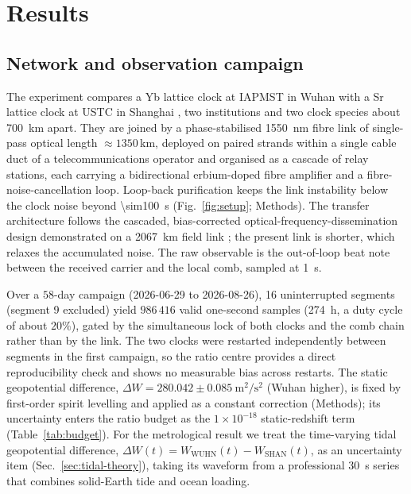 \documentclass[11pt,a4paper]{article}
\newcommand{\dW}{\Delta W}
\newcommand{\e}[1]{\times 10^{#1}}
\begin{document}
\section{Results}

\subsection{Network and observation campaign}
\label{sec:network}

The experiment compares a Yb lattice clock at IAPMST in Wuhan
\citep{zhu2026yb} with a Sr lattice clock at USTC in Shanghai
\citep{jia2026sr}, two institutions and two clock
species about \qty{700}{km} apart. They are joined by a phase-stabilised
\qty{1550}{nm} fibre link of single-pass optical length $\approx1350$\,km,
deployed on paired strands within a single cable duct of a
telecommunications operator and organised as a cascade of relay stations,
each carrying a bidirectional erbium-doped fibre amplifier and a
fibre-noise-cancellation loop. Loop-back purification keeps the link
instability below the clock noise beyond \qty{\sim100}{s}
(Fig.~\ref{fig:setup}; Methods). The transfer architecture follows the
cascaded, bias-corrected optical-frequency-dissemination design
demonstrated on a \qty{2067}{km} field link \citep{chen2026dissemination}; the
present link is shorter, which relaxes the accumulated noise. The raw
observable is the out-of-loop beat note between the received carrier and
the local comb, sampled at \qty{1}{s}.

{\sloppy
Over a $58$-day campaign (2026-06-29 to 2026-08-26), 16 uninterrupted
segments (segment 9 excluded) yield $986\,416$ valid one-second samples
(\qty{274}{h}, a duty cycle of about $20\%$), gated by the simultaneous lock of both clocks
and the comb chain rather than by the link. The two clocks were
restarted independently between segments in the first campaign, so the
ratio centre provides a direct reproducibility check and shows no
measurable bias across restarts. The static geopotential difference,
$\dW = 280.042\pm0.085\ \mathrm{m^{2}/s^{2}}$ (Wuhan higher), is fixed
by first-order spirit levelling and applied as a constant correction
(Methods); its uncertainty enters the ratio budget as the $1\e{-18}$
static-redshift term (Table~\ref{tab:budget}). For the metrological
result we treat the time-varying tidal geopotential difference,
$\dW(t) = W_{\mathrm{WUHN}}(t) - W_{\mathrm{SHAN}}(t)$, as an
uncertainty item (Sec.~\ref{sec:tidal-theory}), taking its waveform
from a professional \qty{30}{s} series that combines solid-Earth tide and
ocean loading.
\par}
\end{document}
